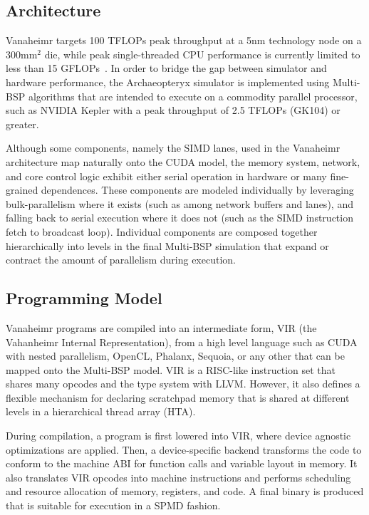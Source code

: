 \documentclass[conference, 10pt]{IEEEtran}
\begin{document}
\subsection{Architecture}
Vanaheimr targets 100 TFLOPs peak throughput at a 5nm technology node on a
300mm$^2$ die, while peak single-threaded CPU performance is currently limited
to less than 15 GFLOPs~\cite{ref:sandybridge-peak}.  In order to bridge the gap
between simulator and hardware performance, the Archaeopteryx simulator is
implemented using Multi-BSP algorithms that are intended to execute on a
commodity parallel processor, such as NVIDIA Kepler with a peak throughput of
2.5 TFLOPs (GK104) or greater.

Although some components, namely the SIMD lanes, used in the Vanaheimr
architecture map naturally onto the CUDA model, the memory system, network,
and core control logic exhibit either serial operation in hardware or many
fine-grained dependences.  These components are modeled individually by
leveraging bulk-parallelism where it exists (such as among network buffers and
lanes), and falling back to serial execution where it does not (such as the
SIMD instruction fetch to broadcast loop). Individual components are composed 
together hierarchically into levels in the final Multi-BSP simulation that
expand or contract the amount of parallelism during execution.  

\subsection{Programming Model}
Vanaheimr programs are compiled into an intermediate form, VIR (the Vahanheimr
Internal Representation), from a high level language such as CUDA with nested
parallelism, OpenCL, Phalanx, Sequoia, or any other that can be mapped onto
the Multi-BSP model. VIR is a RISC-like instruction set that shares many opcodes
and the type system with LLVM.  However, it also defines a flexible mechanism
for declaring scratchpad memory that is shared at different levels in a 
hierarchical thread array (HTA).  

During compilation, a program is first lowered into VIR, where device agnostic
optimizations are applied. Then, a device-specific backend transforms the code
to conform to the machine ABI for function calls and variable layout in memory. 
It also translates VIR opcodes into machine instructions and performs scheduling
and resource allocation of memory, registers, and code.  A final binary is
produced that is suitable for execution in a SPMD fashion.
\end{document}
